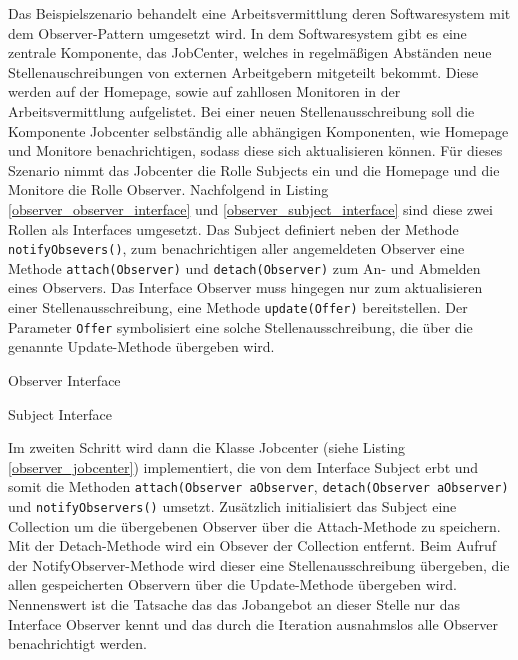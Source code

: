 Das Beispielszenario behandelt eine Arbeitsvermittlung deren Softwaresystem mit dem  Observer-Pattern umgesetzt wird. In dem Softwaresystem gibt es eine zentrale Komponente, das JobCenter, welches in regelmäßigen Abständen neue Stellenauschreibungen von externen Arbeitgebern mitgeteilt bekommt. Diese werden auf der Homepage, sowie auf zahllosen Monitoren in der Arbeitsvermittlung aufgelistet. Bei einer neuen Stellenausschreibung soll die Komponente Jobcenter selbständig alle abhängigen Komponenten, wie Homepage und Monitore benachrichtigen, sodass diese sich aktualisieren können.
Für dieses Szenario nimmt das Jobcenter  die Rolle Subjects ein und die Homepage und die Monitore die Rolle Observer. Nachfolgend in Listing \ref{observer_observer_interface} und \ref{observer_subject_interface} sind diese zwei Rollen als Interfaces umgesetzt.
Das Subject definiert neben der Methode \texttt{notifyObsevers()}, zum benachrichtigen aller angemeldeten Observer eine Methode \texttt{attach(Observer)} und \texttt{detach(Observer)} zum An- und Abmelden eines Observers. Das Interface Observer muss hingegen nur zum aktualisieren einer Stellenausschreibung, eine Methode \texttt{update(Offer)} bereitstellen. Der Parameter \texttt{Offer} symbolisiert eine solche Stellenausschreibung, die über die genannte Update-Methode übergeben wird.


\begin{listing}[h!]
   \centering
   \caption{Observer Interface}
    \label{observer_observer_interface}
\end{listing}     
 
\begin{listing}[h!]
   \centering
   \caption{Subject Interface}
    \label{observer_subject_interface}
\end{listing}  
          
  
Im zweiten Schritt wird dann die Klasse Jobcenter (siehe Listing \ref{observer_jobcenter}) implementiert, die von dem Interface Subject erbt und somit die Methoden \texttt{attach(Observer aObserver}, \texttt{detach(Observer aObserver)} und \texttt{notifyObservers()} umsetzt. Zusätzlich initialisiert das Subject eine Collection um die übergebenen Observer über die Attach-Methode zu speichern. Mit der Detach-Methode wird ein Obsever der Collection entfernt. Beim Aufruf der NotifyObserver-Methode wird dieser eine Stellenausschreibung übergeben, die allen gespeicherten Observern über die Update-Methode übergeben wird. 
Nennenswert ist  die Tatsache das das Jobangebot an dieser Stelle nur das Interface Observer kennt und das durch die Iteration ausnahmslos alle Observer benachrichtigt werden.

